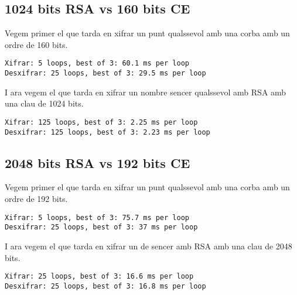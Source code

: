 \documentclass[journal]{IEEEtran}
\begin{document}
\subsection{1024 bits RSA vs 160 bits CE}
Vegem primer el que tarda en xifrar un punt qualssevol amb una corba amb un ordre de 160 bits.
\begin{scriptsize}
\begin{verbatim}
Xifrar: 5 loops, best of 3: 60.1 ms per loop
Desxifrar: 25 loops, best of 3: 29.5 ms per loop
\end{verbatim}
\end{scriptsize}

I ara vegem el que tarda en xifrar un nombre sencer qualssevol amb RSA amb una clau de 1024 bits.
\begin{scriptsize}
\begin{verbatim}
Xifrar: 125 loops, best of 3: 2.25 ms per loop
Desxifrar: 125 loops, best of 3: 2.23 ms per loop
\end{verbatim}
\end{scriptsize}
\subsection{2048 bits RSA vs 192 bits CE}
Vegem primer el que tarda en xifrar un punt qualssevol amb una corba amb un ordre de 192 bits.
%
\begin{scriptsize}
\begin{verbatim}
Xifrar: 5 loops, best of 3: 75.7 ms per loop
Desxifrar: 25 loops, best of 3: 37 ms per loop
\end{verbatim}
\end{scriptsize}
I ara vegem el que tarda en xifrar un de sencer amb RSA amb una clau de 2048 bits.
\begin{scriptsize}
\begin{verbatim}
Xifrar: 25 loops, best of 3: 16.6 ms per loop
Desxifrar: 25 loops, best of 3: 16.8 ms per loop
\end{verbatim}
\end{scriptsize}
\end{document}
